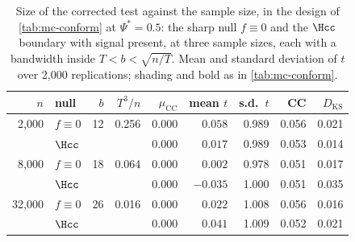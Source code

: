 \begin{table}[htbp]
\centering
\caption{Size of the corrected test against the sample size, in the design of \cref{tab:mc-conform} at $\Psi^*=0.5$: the sharp null $f\equiv0$ and the $\Hcc$ boundary with signal present, at three sample sizes, each with a bandwidth inside $T<b<\sqrt{n/T}$. Mean and standard deviation of $t$ over 2{,}000 replications; shading and bold as in \cref{tab:mc-conform}.}
\label{tab:mc-conform-n}
\small
\setlength{\tabcolsep}{5pt}
\begin{tabular}{rlrrrrrrr}
\toprule
$n$ & null & $b$ & $T^3/n$ & $\mu_{\mathrm{CC}}$ & mean $t$ & s.d.\ $t$ & CC & $D_{\mathrm{KS}}$ \\
\midrule
2{,}000 & $f\equiv0$ & 12 & 0.256 & $0.000$ & $0.058$ & 0.989 & \cellcolor{black!10}0.056 & 0.021 \\
 & $\Hcc$ &  &  & $0.000$ & $0.017$ & 0.989 & \cellcolor{black!10}0.053 & 0.014 \\
8{,}000 & $f\equiv0$ & 18 & 0.064 & $0.000$ & $0.002$ & 0.978 & \cellcolor{black!10}0.051 & 0.017 \\
 & $\Hcc$ &  &  & $0.000$ & $-0.035$ & 1.000 & \cellcolor{black!10}0.051 & 0.035 \\
32{,}000 & $f\equiv0$ & 26 & 0.016 & $0.000$ & $0.022$ & 1.008 & \cellcolor{black!10}0.056 & 0.016 \\
 & $\Hcc$ &  &  & $0.000$ & $0.041$ & 1.009 & \cellcolor{black!10}0.052 & 0.021 \\
\bottomrule
\end{tabular}
\end{table}
